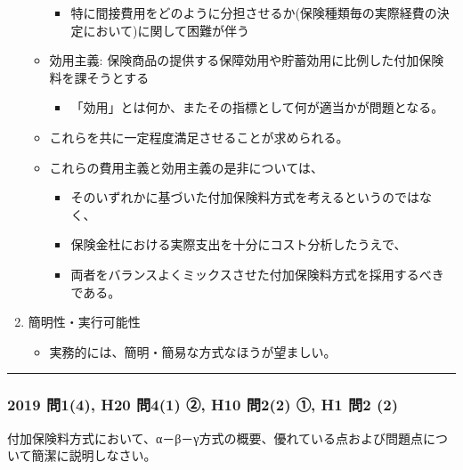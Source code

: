 \documentclass[
]{article}
\providecommand{\tightlist}{%
  \setlength{\itemsep}{0pt}\setlength{\parskip}{0pt}}
\begin{document}
\begin{enumerate}
\begin{itemize}
    \begin{itemize}
    \tightlist
    \item
      特に間接費用をどのように分担させるか(保険種類毎の実際経費の決定において)に関して困難が伴う
    \end{itemize}
  \item
    効用主義:
    保険商品の提供する保障効用や貯蓄効用に比例した付加保険料を課そうとする

    \begin{itemize}
    \tightlist
    \item
      「効用」とは何か、またその指標として何が適当かが問題となる。
    \end{itemize}
  \item
    これらを共に一定程度満足させることが求められる。
  \item
    これらの費用主義と効用主義の是非については、

    \begin{itemize}
    \tightlist
    \item
      そのいずれかに基づいた付加保険料方式を考えるというのではなく、
    \item
      保険金杜における実際支出を十分にコスト分析したうえで、
    \item
      両者をバランスよくミックスさせた付加保険料方式を採用するべきである。
    \end{itemize}
  \end{itemize}
\item
  簡明性・実行可能性

  \begin{itemize}
  \tightlist
  \item
    実務的には、簡明・簡易な方式なほうが望ましい。
  \end{itemize}
\end{enumerate}

\begin{center}\rule{0.5\linewidth}{0.5pt}\end{center}

\hypertarget{ux554f14-h20-ux554f41-ux2461-h10-ux554f22-ux2460-h1-ux554f2-2}{%
\subsubsection{2019 問1(4), H20 問4(1) ②, H10 問2(2) ①, H1 問2
(2)}\label{ux554f14-h20-ux554f41-ux2461-h10-ux554f22-ux2460-h1-ux554f2-2}}

付加保険料方式において、α－β－γ方式の概要、優れている点および問題点について簡潔に説明しなさい。
\end{document}
